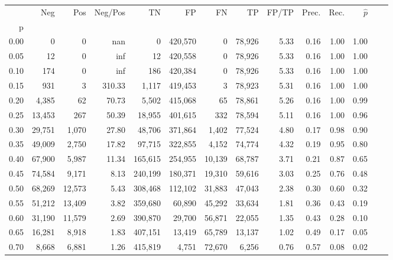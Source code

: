 \begin{tabular}{rrrrrrrrrrrrrr}
\toprule
{} &     Neg &     Pos & Neg/Pos &       TN &       FP &      FN &      TP & FP/TP & Prec. &  Rec. & $\hat{p}$ \\
p    &         &         &         &          &          &         &         &       &       &       &           \\
\midrule
0.00 &       0 &       0 &     nan &        0 &  420,570 &       0 &  78,926 &  5.33 &  0.16 &  1.00 &      1.00 \\
0.05 &      12 &       0 &     inf &       12 &  420,558 &       0 &  78,926 &  5.33 &  0.16 &  1.00 &      1.00 \\
0.10 &     174 &       0 &     inf &      186 &  420,384 &       0 &  78,926 &  5.33 &  0.16 &  1.00 &      1.00 \\
0.15 &     931 &       3 &  310.33 &    1,117 &  419,453 &       3 &  78,923 &  5.31 &  0.16 &  1.00 &      1.00 \\
0.20 &   4,385 &      62 &   70.73 &    5,502 &  415,068 &      65 &  78,861 &  5.26 &  0.16 &  1.00 &      0.99 \\
0.25 &  13,453 &     267 &   50.39 &   18,955 &  401,615 &     332 &  78,594 &  5.11 &  0.16 &  1.00 &      0.96 \\
0.30 &  29,751 &   1,070 &   27.80 &   48,706 &  371,864 &   1,402 &  77,524 &  4.80 &  0.17 &  0.98 &      0.90 \\
0.35 &  49,009 &   2,750 &   17.82 &   97,715 &  322,855 &   4,152 &  74,774 &  4.32 &  0.19 &  0.95 &      0.80 \\
0.40 &  67,900 &   5,987 &   11.34 &  165,615 &  254,955 &  10,139 &  68,787 &  3.71 &  0.21 &  0.87 &      0.65 \\
0.45 &  74,584 &   9,171 &    8.13 &  240,199 &  180,371 &  19,310 &  59,616 &  3.03 &  0.25 &  0.76 &      0.48 \\
0.50 &  68,269 &  12,573 &    5.43 &  308,468 &  112,102 &  31,883 &  47,043 &  2.38 &  0.30 &  0.60 &      0.32 \\
0.55 &  51,212 &  13,409 &    3.82 &  359,680 &   60,890 &  45,292 &  33,634 &  1.81 &  0.36 &  0.43 &      0.19 \\
0.60 &  31,190 &  11,579 &    2.69 &  390,870 &   29,700 &  56,871 &  22,055 &  1.35 &  0.43 &  0.28 &      0.10 \\
0.65 &  16,281 &   8,918 &    1.83 &  407,151 &   13,419 &  65,789 &  13,137 &  1.02 &  0.49 &  0.17 &      0.05 \\
0.70 &   8,668 &   6,881 &    1.26 &  415,819 &    4,751 &  72,670 &   6,256 &  0.76 &  0.57 &  0.08 &      0.02 \\

\end{tabular}
